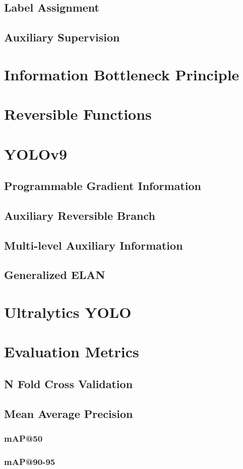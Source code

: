 \subsection{Label Assignment}
\subsection{Auxiliary Supervision}

\section{Information Bottleneck Principle}
\section{Reversible Functions}


\section{YOLOv9}
\subsection{Programmable Gradient Information}
\subsection{Auxiliary Reversible Branch}
\subsection{Multi-level Auxiliary Information}
\subsection{Generalized ELAN}

\section{Ultralytics YOLO}
\section{Evaluation Metrics}
\subsection{N Fold Cross Validation}
\subsection{Mean Average Precision}
\subsubsection{mAP@50}
\subsubsection{mAP@90-95}


